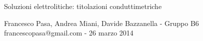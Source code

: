 \documentclass[11pt, twoside, a4paper]{article}
\begin{document}
\begin{center}

        {\huge Soluzioni elettrolitiche: titolazioni conduttimetriche}
    \vspace{0.1cm}

      	{Francesco Pasa, Andrea Miani, Davide Bazzanella - Gruppo B6} \\
      	{francescopasa@gmail.com - 26 marzo 2014}
    \vspace{-0.2cm}

\end{center}





\end{document}
